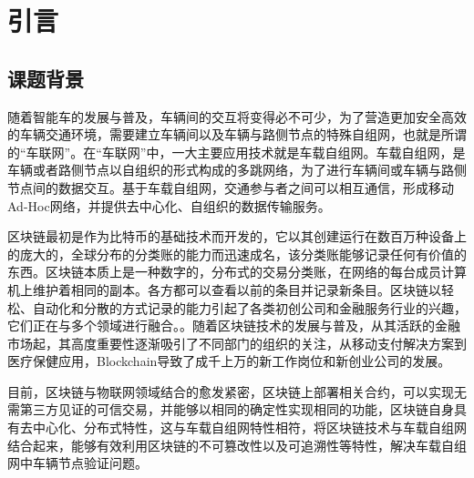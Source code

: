 %
%
%
%
%
%

\chapter{引言}

\section{课题背景}
随着智能车的发展与普及，车辆间的交互将变得必不可少，为了营造更加安全高效的车辆交通环境，需要建立车辆间以及车辆与路侧节点的特殊自组网，也就是所谓的“车联网”。在“车联网”中，一大主要应用技术就是车载自组网。车载自组网，是车辆或者路侧节点以自组织的形式构成的多跳网络，为了进行车辆间或车辆与路侧节点间的数据交互\cite{朱雪田20195g}。基于车载自组网，交通参与者之间可以相互通信，形成移动Ad-Hoc网络，并提供去中心化、自组织的数据传输服务\cite{sakiz2017survey}。

区块链最初是作为比特币的基础技术而开发的，它以其创建运行在数百万种设备上的庞大的，全球分布的分类账的能力而迅速成名，该分类账能够记录任何有价值的东西。区块链本质上是一种数字的，分布式的交易分类账，在网络的每台成员计算机上维护着相同的副本。各方都可以查看以前的条目并记录新条目。区块链以轻松、自动化和分散的方式记录的能力引起了各类初创公司和金融服务行业的兴趣，它们正在与多个领域进行融合。\cite{oparah3ways,kar2016estonian}。随着区块链技术的发展与普及，从其活跃的金融市场起，其高度重要性逐渐吸引了不同部门的组织的关注，从移动支付解决方案到医疗保健应用，Blockchain导致了成千上万的新工作岗位和新创业公司的发展\cite{dorri2017blockchain}。

目前，区块链与物联网领域结合的愈发紧密\cite{袁勇2016区块链技术发展现状与展望}，区块链上部署相关合约，可以实现无需第三方见证的可信交易，并能够以相同的确定性实现相同的功能，区块链自身具有去中心化、分布式特性，这与车载自组网特性相符，将区块链技术与车载自组网结合起来，能够有效利用区块链的不可篡改性以及可追溯性等特性，解决车载自组网中车辆节点验证问题。

